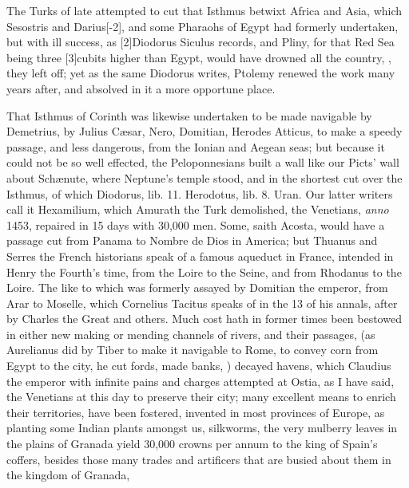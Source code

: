 {The Turks of late attempted to cut that Isthmus betwixt Africa and
Asia, which Sesostris and Darius[-2\baselineskip], and some Pharaohs of Egypt had
formerly undertaken, but with ill success, as [2\baselineskip]Diodorus Siculus
records, and Pliny, for that Red Sea being three [3\baselineskip]cubits higher
than Egypt, would have drowned all the country, ,
they left off; yet as the same Diodorus writes, Ptolemy renewed
the work many years after, and absolved in it a more opportune place.

That Isthmus of Corinth was likewise undertaken to be made navigable by
Demetrius, by Julius C\ae{}sar, Nero, Domitian, Herodes Atticus, to make a
speedy passage, and less dangerous, from the Ionian and Aegean
seas; but because it could not be so well effected, the Peloponnesians
built a wall like our Picts' wall about Sch\ae{}nute, where Neptune's
temple stood, and in the shortest cut over the Isthmus, of which
Diodorus, lib. 11. Herodotus, lib. 8. Uran. Our latter writers call it
Hexamilium, which Amurath the Turk demolished, the Venetians, \emph{anno}
1453, repaired in 15 days with 30,000 men. Some, saith Acosta, would
have a passage cut from Panama to Nombre de Dios in America; but
Thuanus and Serres the French historians speak of a famous aqueduct in
France, intended in Henry the Fourth's time, from the Loire to the
Seine, and from Rhodanus to the Loire. The like to which was formerly
assayed by Domitian the emperor, from Arar to Moselle, which
Cornelius Tacitus speaks of in the 13 of his annals, after by Charles
the Great and others. Much cost hath in former times been bestowed in
either new making or mending channels of rivers, and their passages,
(as Aurelianus did by Tiber to make it navigable to Rome, to convey
corn from Egypt to the city,  he cut fords, made banks, \etc{})
decayed havens, which Claudius the emperor with infinite pains and
charges attempted at Ostia, as I have said, the Venetians at this day
to preserve their city; many excellent means to enrich their
territories, have been fostered, invented in most provinces of Europe,
as planting some Indian plants amongst us, silkworms, the very
mulberry leaves in the plains of Granada yield 30,000 crowns per annum
to the king of Spain's coffers, besides those many trades and
artificers that are busied about them in the kingdom of Granada,
}
